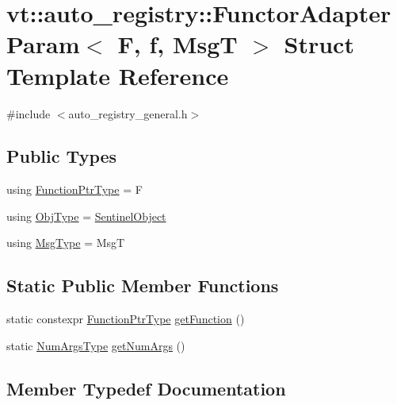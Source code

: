 \hypertarget{structvt_1_1auto__registry_1_1_functor_adapter_param}{}\section{vt\+:\+:auto\+\_\+registry\+:\+:Functor\+Adapter\+Param$<$ F, f, MsgT $>$ Struct Template Reference}
\label{structvt_1_1auto__registry_1_1_functor_adapter_param}


{\ttfamily \#include $<$auto\+\_\+registry\+\_\+general.\+h$>$}

\subsection*{Public Types}
\begin{DoxyCompactItemize}
\item 
using \hyperlink{structvt_1_1auto__registry_1_1_functor_adapter_param_a265b01cc62bfbdd828d8e69d98391577}{Function\+Ptr\+Type} = F
\item 
using \hyperlink{structvt_1_1auto__registry_1_1_functor_adapter_param_a8a1e0cb0c823a95322a4a16b65a41d6f}{Obj\+Type} = \hyperlink{structvt_1_1auto__registry_1_1_sentinel_object}{Sentinel\+Object}
\item 
using \hyperlink{structvt_1_1auto__registry_1_1_functor_adapter_param_a6c3d915609c4370031f476b323965d2d}{Msg\+Type} = MsgT
\end{DoxyCompactItemize}
\subsection*{Static Public Member Functions}
\begin{DoxyCompactItemize}
\item 
static constexpr \hyperlink{structvt_1_1auto__registry_1_1_functor_adapter_param_a265b01cc62bfbdd828d8e69d98391577}{Function\+Ptr\+Type} \hyperlink{structvt_1_1auto__registry_1_1_functor_adapter_param_a370a6ead9ce6032a4fb73cd199491702}{get\+Function} ()
\item 
static \hyperlink{namespacevt_1_1auto__registry_aebda1d9d765bc9147dc654ad0712c936}{Num\+Args\+Type} \hyperlink{structvt_1_1auto__registry_1_1_functor_adapter_param_a668d91eaa8c7f8ca694c7ec61234aad3}{get\+Num\+Args} ()
\end{DoxyCompactItemize}


\subsection{Member Typedef Documentation}
\mbox{\label{structvt_1_1auto__registry_1_1_functor_adapter_param_a265b01cc62bfbdd828d8e69d98391577}} 
